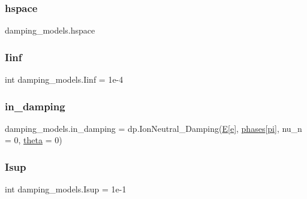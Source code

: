\mbox{\label{namespacedamping__models_ae41240318f8ca9a2e54952f789bcdfa2}} 
\subsubsection{\texorpdfstring{hspace}{hspace}}
{\footnotesize\ttfamily damping\+\_\+models.\+hspace}

\mbox{\label{namespacedamping__models_a0aeed3b4b17299d1e84f5e9c5135a1bf}} 
\subsubsection{\texorpdfstring{Iinf}{Iinf}}
{\footnotesize\ttfamily int damping\+\_\+models.\+Iinf = 1e-\/4}

\mbox{\label{namespacedamping__models_a9e0599bc950ce129b82fa342b00ba279}} 
\subsubsection{\texorpdfstring{in\+\_\+damping}{in\_damping}}
{\footnotesize\ttfamily damping\+\_\+models.\+in\+\_\+damping = dp.\+Ion\+Neutral\+\_\+\+Damping(\hyperlink{namespacedamping__models_a2d49832acd95610ad1ef20d532cda813}{E}\mbox{[}\hyperlink{constants_8h_a2b076531cd50c7b55702a53221f2ac72}{e}\mbox{]}, \hyperlink{namespacedamping__models_add17c980396e6cf0498d139343c17cd3}{phases}\mbox{[}\hyperlink{constants_8h_a43016d873124d39034edb8cd164794db}{pi}\mbox{]}, nu\+\_\+n = 0, \hyperlink{cr__source_8h_a91a3bf9ce71325c8a7cbd31d8c474bff}{theta} = 0)}

\mbox{\label{namespacedamping__models_afef6a2629db83400503a3b1a4985af51}} 
\subsubsection{\texorpdfstring{Isup}{Isup}}
{\footnotesize\ttfamily int damping\+\_\+models.\+Isup = 1e-\/1}

